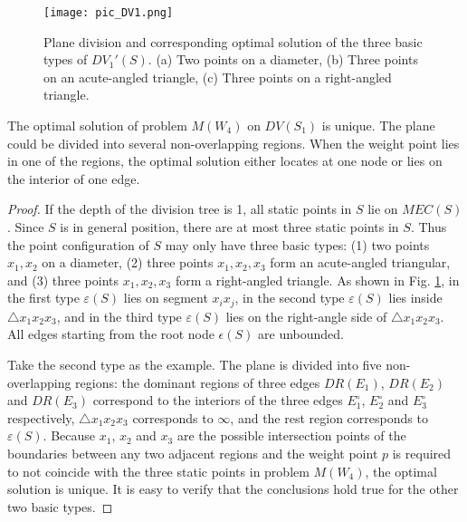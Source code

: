 \documentclass[final,3p,times]{elsarticle}
\begin{document}
\begin{figure}
  \centering
  \texttt{[image: pic\_DV1.png]}\\
  \caption{Plane division and corresponding optimal solution of the three basic types of $DV_1'(S)$. (a) Two points on a diameter, (b) Three points on an acute-angled triangle, (c) Three points on a right-angled triangle.}
  \label{pic_os_depth1}
\end{figure}

\begin{Lemma}
\label{lemma_start}
The optimal solution of problem $M(W_4)$ on $DV(S_1)$ is unique. The plane could be divided into several non-overlapping regions. When the weight point lies in one of the regions, the optimal solution either locates at one node or lies on the interior of one edge.
\end{Lemma}
\begin{proof}
If the depth of the division tree is 1, all static points in $S$ lie on $MEC(S)$. Since $S$ is in general position, there are at most three static points in $S$. Thus the point configuration of $S$ may only have three basic types: (1) two points $x_1,x_2$ on a diameter, (2) three points $x_1,x_2,x_3$ form an acute-angled triangular, and (3) three points $x_1,x_2,x_3$ form a right-angled triangle. As shown in Fig. \ref{pic_os_depth1}, in the first type $\varepsilon(S)$ lies on segment $x_ix_j$, in the second type $\varepsilon(S)$ lies inside $\triangle x_1x_2x_3$, and in the third type $\varepsilon(S)$ lies on the right-angle side of $\triangle x_1x_2x_3$. All edges starting from the root node $\epsilon(S)$ are unbounded.

Take the second type as the example. The plane is divided into five non-overlapping regions: the dominant regions of three edges $DR(E_1)$, $DR(E_2)$ and $DR(E_3)$ correspond to the interiors of the three edges $E_1^\circ$, $E_2^\circ$ and $E_3^\circ$ respectively, $\triangle x_1x_2x_3$ corresponds to $\infty$, and the rest region corresponds to $\varepsilon(S)$. Because $x_1$, $x_2$ and $x_3$ are the possible intersection points of the boundaries between any two adjacent regions and the weight point $p$ is required to not coincide with the three static points in problem $M(W_4)$, the optimal solution is unique. It is easy to verify that the conclusions hold true for the other two basic types. %
\end{proof}
\end{document}
